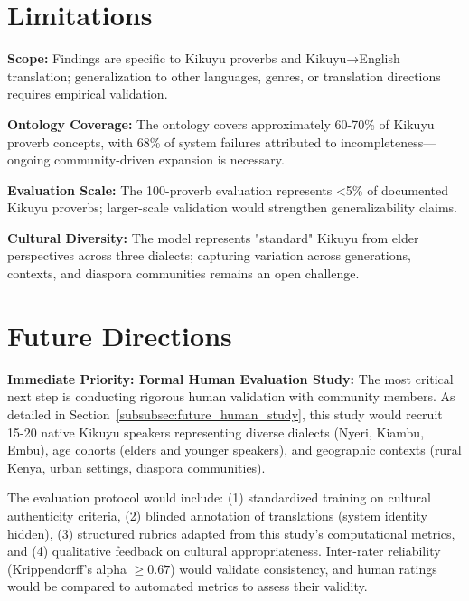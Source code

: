 \section{Limitations}
\label{sec:conclusion_limitations}

\textbf{Scope:} Findings are specific to Kikuyu proverbs and Kikuyu→English translation; generalization to other languages, genres, or translation directions requires empirical validation.

\textbf{Ontology Coverage:} The ontology covers approximately 60-70\% of Kikuyu proverb concepts, with 68\% of system failures attributed to incompleteness—ongoing community-driven expansion is necessary.

\textbf{Evaluation Scale:} The 100-proverb evaluation represents <5\% of documented Kikuyu proverbs; larger-scale validation would strengthen generalizability claims.

\textbf{Cultural Diversity:} The model represents "standard" Kikuyu from elder perspectives across three dialects; capturing variation across generations, contexts, and diaspora communities remains an open challenge.

\section{Future Directions}
\label{sec:future_work}

\textbf{Immediate Priority: Formal Human Evaluation Study:} The most critical next step is conducting rigorous human validation with community members. As detailed in Section~\ref{subsubsec:future_human_study}, this study would recruit 15-20 native Kikuyu speakers representing diverse dialects (Nyeri, Kiambu, Embu), age cohorts (elders and younger speakers), and geographic contexts (rural Kenya, urban settings, diaspora communities).

The evaluation protocol would include: (1) standardized training on cultural authenticity criteria, (2) blinded annotation of translations (system identity hidden), (3) structured rubrics adapted from this study's computational metrics, and (4) qualitative feedback on cultural appropriateness. Inter-rater reliability (Krippendorff's alpha $\geq 0.67$) would validate consistency, and human ratings would be compared to automated metrics to assess their validity.

